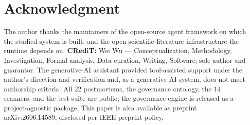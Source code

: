 \documentclass[conference]{IEEEtran}
\begin{document}
\section*{Acknowledgment}
The author thanks the maintainers of the open-source agent framework on
which the studied system is built, and the open scientific-literature
infrastructure the runtime depends on. \textbf{CRediT:} Wei Wu ---
Conceptualization, Methodology, Investigation, Formal analysis, Data
curation, Writing, Software; sole author and guarantor. The generative-AI
assistant provided tool-assisted support under the author's direction and
verification and, as a generative-AI system, does not meet authorship
criteria. All 22 postmortems, the governance ontology, the 14 scanners,
and the test suite are public; the governance engine is released as a
project-agnostic package. This paper is also available as preprint
arXiv:2606.14589, disclosed per IEEE preprint policy.
\end{document}
